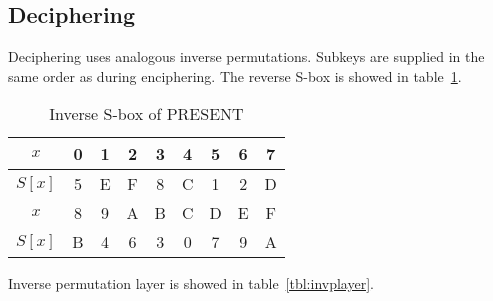 \subsection{Deciphering}

Deciphering uses analogous inverse permutations. Subkeys are supplied in the
same order as during enciphering. The reverse S-box is showed in
table~\ref{tbl:invsbox}.
\begin{table}[hbp]
    \caption{Inverse S-box of PRESENT}
    \label{tbl:invsbox}
    \small
    \centering
    \begin{tabular}{|c||c|c|c|c|c|c|c|c|}
        \hline
        $ x $ & 0 & 1 & 2 & 3 & 4 & 5 & 6 & 7 \\
        \hline
        $S[x]$& 5 & E & F & 8 & C & 1 & 2 & D \\
        \hline
        $x$ & 8 & 9 & A & B & C & D & E & F \\
        \hline
        $S[x]$ & B & 4 & 6 & 3 & 0 & 7 & 9 & A \\ 
        \hline
    \end{tabular}
\end{table}
Inverse permutation layer is showed in table~\ref{tbl:invplayer}.

